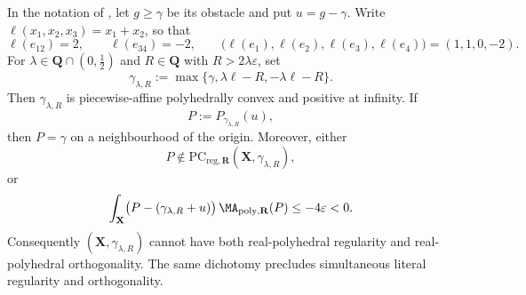 \begin{proposition}\label{prop:frontier-polyhedral-bergman-positive-infinity-obstruction}
In the notation of \cite[Example~6.24 and Claim~6.25]{BMPS26}, let
\(g\geq\gamma\) be its obstacle and put \(u=g-\gamma\).  Write
\(\ell(x_1,x_2,x_3)=x_1+x_2\), so that
\[
 \ell(e_{12})=2,
 \qquad
 \ell(e_{34})=-2,
 \qquad
 \bigl(\ell(e_1),\ell(e_2),\ell(e_3),\ell(e_4)\bigr)
   =(1,1,0,-2).
\]
For \(\lambda\in\mathbf Q\cap(0,\tfrac12)\) and
\(R\in\mathbf Q\) with \(R>2\lambda\varepsilon\), set
\[
 \gamma_{\lambda,R}
   :=\max\{\gamma,\lambda\ell-R,-\lambda\ell-R\}.
\]
Then \(\gamma_{\lambda,R}\) is piecewise-affine polyhedrally convex and
positive at infinity.  If
\[
 P:=P_{\gamma_{\lambda,R}}(u),
\]
then \(P=\gamma\) on a neighbourhood of the origin.  Moreover, either
\[
 P\notin
 \mathrm{PC}_{\mathrm{reg},\mathbf R}
     (\mathbf X,\gamma_{\lambda,R}),
\]
or
\[
 \int_{\mathbf X}
 \bigl(P-(\gamma_{\lambda,R}+u)\bigr)\,
 \MA_{\mathrm{poly},\mathbf R}(P)
 \leq -4\varepsilon<0.
\]
Consequently \((\mathbf X,\gamma_{\lambda,R})\) cannot have both
real-polyhedral regularity and real-polyhedral orthogonality.  The same
dichotomy precludes simultaneous literal regularity and orthogonality.
\end{proposition}

